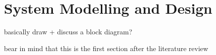 \chapter{System Modelling and Design}

{\Large \color{red} basically draw + discuss a block diagram?}

{\Large \color{red} bear in mind that this is the first section after the literature review}
